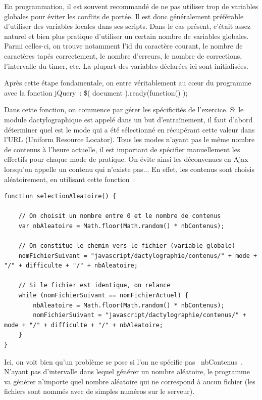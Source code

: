\documentclass[a4paper,12pt]{article}
\begin{document}
En programmation, il est souvent recommandé de ne pas utiliser trop de variables globales pour éviter les conflits de portée. Il est donc généralement préférable d'utiliser des variables locales dans ses scripts. Dans le cas présent, c'était assez naturel et bien plus pratique d'utiliser un certain nombre de variables globales. Parmi celles-ci, on trouve notamment l'id du caractère courant, le nombre de caractères tapés correctement, le nombre d'erreurs, le nombre de corrections, l'intervalle du timer, etc. La plupart des variables déclarées ici sont initialisées.

Après cette étape fondamentale, on entre véritablement au cœur du programme avec la fonction jQuery~: \$( document ).ready(function() {});

Dans cette fonction, on commence par gérer les spécificités de l'exercice. Si le module dactylographique est appelé dans un but d'entraînement, il faut d'abord déterminer quel est le mode qui a été sélectionné en récupérant cette valeur dans l'URL (Uniform Resource Locator). Tous les modes n'ayant pas le même nombre de contenus à l'heure actuelle, il est important de spécifier manuellement les effectifs pour chaque mode de pratique. On évite ainsi les déconvenues en Ajax lorsqu'on appelle un contenu qui n'existe pas... En effet, les contenus sont choisis aléatoirement, en utilisant cette fonction~:

\begin{lstlisting}
function selectionAleatoire() {

    // On choisit un nombre entre 0 et le nombre de contenus
    var nbAleatoire = Math.floor(Math.random() * nbContenus);
    
    // On constitue le chemin vers le fichier (variable globale)
    nomFichierSuivant = "javascript/dactylographie/contenus/" + mode + "/" + difficulte + "/" + nbAleatoire;
    
    // Si le fichier est identique, on relance
    while (nomFichierSuivant == nomFichierActuel) {
        nbAleatoire = Math.floor(Math.random() * nbContenus);
        nomFichierSuivant = "javascript/dactylographie/contenus/" + mode + "/" + difficulte + "/" + nbAleatoire;
    }
}
\end{lstlisting}


Ici, on voit bien qu'un problème se pose si l'on ne spécifie pas \og~nbContenus~\fg. N'ayant pas d'intervalle dans lequel générer un nombre aléatoire, le programme va générer n'importe quel nombre aléatoire qui ne correspond à aucun fichier (les fichiers sont nommés avec de simples numéros sur le serveur).
\end{document}
